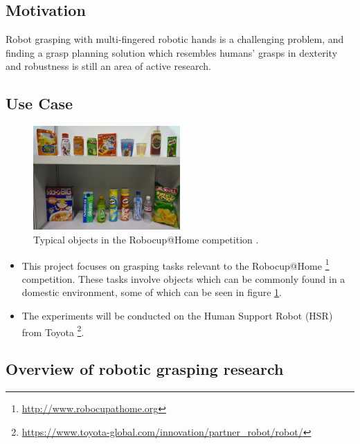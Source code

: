 \documentclass[runningheads]{../llncs}
\begin{document}
\subsection{Motivation}

Robot grasping with multi-fingered robotic hands is a challenging problem, and finding a grasp planning solution which
resembles humans' grasps in dexterity and robustness is still an area of active research.

\subsection{Use Case}

\begin{figure}[h!]
    \centering
    \includegraphics[width=0.5\textwidth]{robocup_typical_objects}
    \caption{Typical objects in the Robocup@Home competition \cite{robocupRulebook2018}.}
    \label{fig:robocup_objects}
\end{figure}

\begin{itemize}
    \item This project focuses on grasping tasks relevant to the Robocup@Home
            \footnote{\url{http://www.robocupathome.org}} competition. These tasks involve objects which can be commonly
            found in a domestic environment, some of which can be seen in figure \ref{fig:robocup_objects}.
    \item The experiments will be conducted on the Human Support Robot (HSR) from Toyota
            \footnote{\url{https://www.toyota-global.com/innovation/partner_robot/robot/}}.
\end{itemize}

\subsection{Overview of robotic grasping research}
\end{document}
